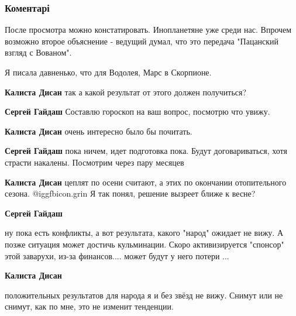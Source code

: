  
 
 
 
 
\subsubsection{Коментарі}
\label{sec:26_11_2021.fb.bondarenko_elena.1.gosperevorot_kuhnja.cmt}

\begin{itemize} %

После просмотра можно констатировать. Инопланетяне уже среди нас. Впрочем
возможно второе объяснение - ведущий думал, что это передача "Пацанский взгляд
с Вованом".

Я писала давненько, что для Водолея,
Марс в Скорпионе.

\begin{itemize} %
\textbf{Калиста Дисан} так а какой результат от этого должен получиться?

\textbf{Сергей Гайдаш} Составлю гороскоп на ваш вопрос, посмотрю что увижу.

\textbf{Калиста Дисан} очень интересно было бы почитать.

\textbf{Сергей Гайдаш} пока ничем, идет подготовка пока. Будут договариваться, хотя страсти накалены. Посмотрим через пару месяцев

\textbf{Калиста Дисан} цеплят по осени считают, а этих по окончании отопительного сезона.  @igg{fbicon.grin}  Я так понял, решение вызреет ближе к весне?

\textbf{Сергей Гайдаш} 

ну пока есть конфликты, а вот результата, какого "народ" ожидает не вижу. А
позже ситуация может достичь кульминации. Скоро активизируется "спонсор" этой
заварухи, из-за финансов.... может будут у него потери ...

\textbf{Калиста Дисан} 

положительных результатов для народа я и без звёзд не вижу. Снимут или не
снимут, как по мне, это не изменит тенденции.


\end{itemize}
\end{itemize}
